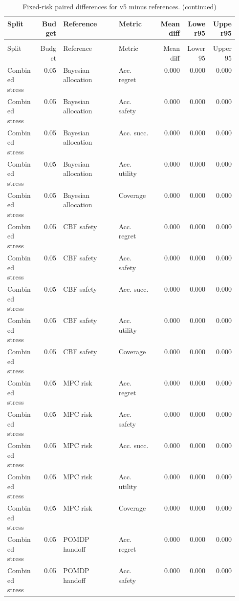 \documentclass{article}
\begin{document}
\begin{center}
\tiny
\begin{longtable}{p{0.14\linewidth}rp{0.24\linewidth}p{0.17\linewidth}rrr}
\caption{Fixed-risk paired differences for v5 minus references.}\label{tab:fixedpairs}\\
\toprule
Split & Budget & Reference & Metric & Mean diff & Lower95 & Upper95\\
\midrule
\endfirsthead
\caption[]{Fixed-risk paired differences for v5 minus references. (continued)}\\
\toprule
Split & Budget & Reference & Metric & Mean diff & Lower95 & Upper95\\
\midrule
\endhead
Combined stress & 0.05 & Bayesian allocation & Acc. regret & 0.000 & 0.000 & 0.000\\
Combined stress & 0.05 & Bayesian allocation & Acc. safety & 0.000 & 0.000 & 0.000\\
Combined stress & 0.05 & Bayesian allocation & Acc. succ. & 0.000 & 0.000 & 0.000\\
Combined stress & 0.05 & Bayesian allocation & Acc. utility & 0.000 & 0.000 & 0.000\\
Combined stress & 0.05 & Bayesian allocation & Coverage & 0.000 & 0.000 & 0.000\\
Combined stress & 0.05 & CBF safety & Acc. regret & 0.000 & 0.000 & 0.000\\
Combined stress & 0.05 & CBF safety & Acc. safety & 0.000 & 0.000 & 0.000\\
Combined stress & 0.05 & CBF safety & Acc. succ. & 0.000 & 0.000 & 0.000\\
Combined stress & 0.05 & CBF safety & Acc. utility & 0.000 & 0.000 & 0.000\\
Combined stress & 0.05 & CBF safety & Coverage & 0.000 & 0.000 & 0.000\\
Combined stress & 0.05 & MPC risk & Acc. regret & 0.000 & 0.000 & 0.000\\
Combined stress & 0.05 & MPC risk & Acc. safety & 0.000 & 0.000 & 0.000\\
Combined stress & 0.05 & MPC risk & Acc. succ. & 0.000 & 0.000 & 0.000\\
Combined stress & 0.05 & MPC risk & Acc. utility & 0.000 & 0.000 & 0.000\\
Combined stress & 0.05 & MPC risk & Coverage & 0.000 & 0.000 & 0.000\\
Combined stress & 0.05 & POMDP handoff & Acc. regret & 0.000 & 0.000 & 0.000\\
Combined stress & 0.05 & POMDP handoff & Acc. safety & 0.000 & 0.000 & 0.000\\

\end{longtable}
\end{center}
\end{document}
